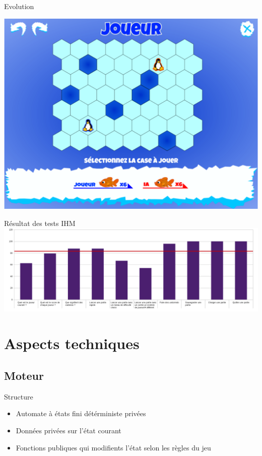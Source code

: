 \documentclass{beamer}
\begin{document}
\begin{frame}{Evolution}
    \begin{center}
      \includegraphics[scale=0.25]{ancienPlateau}
    \end{center}
\end{frame}

\begin{frame}{Résultat des tests IHM}
  \includegraphics[scale=0.25]{graphIHM}
\end{frame}

\section{Aspects techniques}


\subsection{Moteur}

\begin{frame}{Structure}
\begin{block}{}
\begin{itemize}
\item<1-> Automate à états fini détérministe privées
\item<2-> Données privées sur l'état courant
\item<3-> Fonctions publiques qui modifients l'état selon les règles du jeu
\end{itemize}
\end{block}
\end{frame}
\end{document}
